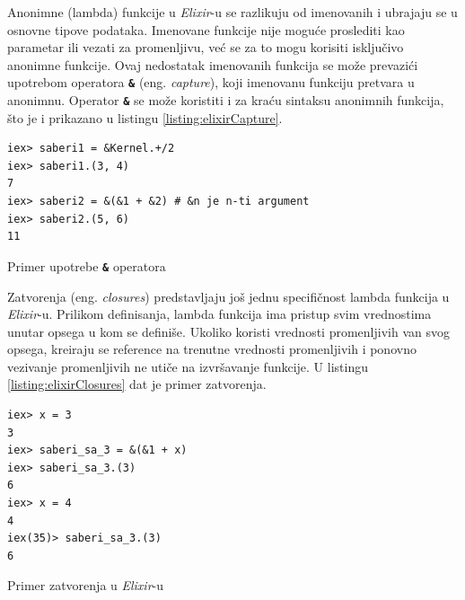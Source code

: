 \documentclass[12pt,oneside]{memoir}
\begin{document}
Anonimne (lambda) funkcije u \emph{Elixir}-u se razlikuju od imenovanih i ubrajaju se u osnovne tipove
podataka. Imenovane funkcije nije moguće proslediti kao parametar ili vezati za promenljivu,
već se za to mogu korisiti isključivo anonimne funkcije. Ovaj nedostatak imenovanih funkcija se može prevazići upotrebom
operatora \texttt{\textbf{\&}} (eng. \emph{capture}), koji imenovanu funkciju pretvara u
anonimnu. Operator \texttt{\textbf{\&}} se može koristiti i za kraću sintaksu anonimnih funkcija,
što je i prikazano u listingu \ref{listing:elixirCapture}.
\begin{listing}[!h]
\begin{verbatim}
iex> saberi1 = &Kernel.+/2
iex> saberi1.(3, 4)
7
iex> saberi2 = &(&1 + &2) # &n je n-ti argument
iex> saberi2.(5, 6)
11
\end{verbatim}
\caption{Primer upotrebe \texttt{\textbf{\&}} operatora}
\label{listing:elixirCapture}
\end{listing}

Zatvorenja (eng. \emph{closures}) predstavljaju još jednu specifičnost lambda funkcija u
\emph{Elixir}-u. Prilikom definisanja, lambda funkcija ima pristup svim vrednostima unutar opsega u
kom se definiše. Ukoliko koristi vrednosti promenljivih van svog opsega, kreiraju se reference na trenutne
vrednosti promenljivih i ponovno vezivanje promenljivih ne utiče na izvršavanje funkcije. U
listingu \ref{listing:elixirClosures} dat je primer zatvorenja.
\begin{listing}[!h]
\begin{verbatim}
iex> x = 3
3
iex> saberi_sa_3 = &(&1 + x)
iex> saberi_sa_3.(3)
6
iex> x = 4
4
iex(35)> saberi_sa_3.(3)
6
\end{verbatim}
\caption{Primer zatvorenja u \emph{Elixir}-u}
\label{listing:elixirClosures}
\end{listing}
 
\end{document}
